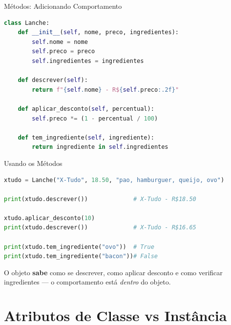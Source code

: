 \documentclass[aspectratio=169]{beamer}
\begin{document}
\begin{frame}[fragile]{Métodos: Adicionando Comportamento}
  \begin{lstlisting}[language=Python]
class Lanche:
    def __init__(self, nome, preco, ingredientes):
        self.nome = nome
        self.preco = preco
        self.ingredientes = ingredientes

    def descrever(self):
        return f"{self.nome} - R${self.preco:.2f}"

    def aplicar_desconto(self, percentual):
        self.preco *= (1 - percentual / 100)

    def tem_ingrediente(self, ingrediente):
        return ingrediente in self.ingredientes
  \end{lstlisting}
\end{frame}

\begin{frame}[fragile]{Usando os Métodos}
  \begin{lstlisting}[language=Python]
xtudo = Lanche("X-Tudo", 18.50, "pao, hamburguer, queijo, ovo")

print(xtudo.descrever())             # X-Tudo - R$18.50

xtudo.aplicar_desconto(10)
print(xtudo.descrever())             # X-Tudo - R$16.65

print(xtudo.tem_ingrediente("ovo"))  # True
print(xtudo.tem_ingrediente("bacon"))# False
  \end{lstlisting}

  \vspace{0.3cm}
  O objeto \textbf{sabe} como se descrever, como aplicar desconto
  e como verificar ingredientes --- o comportamento está \emph{dentro} do objeto.
\end{frame}

\section{Atributos de Classe vs Instância}
\end{document}
